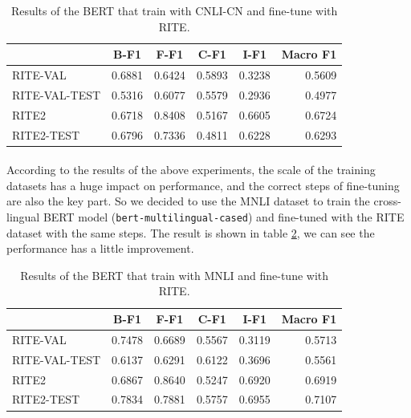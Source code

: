 \documentclass[12pt]{article}
\begin{document}
\begin{CJK*}{UTF8}{bkai}
\begin{spacing}{1.77}
\begin{table}[ht!]
  \centering
  \begin{tabular}{|l|r|r|r|r|r|}
  \hline
   & \multicolumn{1}{c|}{B-F1} & \multicolumn{1}{c|}{F-F1} & \multicolumn{1}{c|}{C-F1} & \multicolumn{1}{c|}{I-F1} & \multicolumn{1}{c|}{Macro F1} \\ \hline
  RITE-VAL & 0.6881 & 0.6424 & 0.5893 & 0.3238 & 0.5609 \\ \hline
  RITE-VAL-TEST & 0.5316 & 0.6077 & 0.5579 & 0.2936 & 0.4977 \\ \hline
  RITE2 & 0.6718 & 0.8408 & 0.5167 & 0.6605 & 0.6724 \\ \hline
  RITE2-TEST & 0.6796 & 0.7336 & 0.4811 & 0.6228 & 0.6293 \\ \hline
  \end{tabular}
  \caption{Results of the BERT that train with CNLI-CN and fine-tune with RITE.}
  \label{result:bert_cnli_cn}
\end{table}

\paragraph{}
According to the results of the above experiments, the scale of the training datasets has a huge impact on performance, and the correct steps of fine-tuning are also the key part. So we decided to use the MNLI dataset to train the cross-lingual BERT model (\texttt{bert-multilingual-cased}) and fine-tuned with the RITE dataset with the same steps. The result is shown in table \ref{result:bert_mnli_transfer}, we can see the performance has a little improvement.

\begin{table}[ht!]
  \centering
  \begin{tabular}{|l|r|r|r|r|r|}
  \hline
   & \multicolumn{1}{c|}{B-F1} & \multicolumn{1}{c|}{F-F1} & \multicolumn{1}{c|}{C-F1} & \multicolumn{1}{c|}{I-F1} & \multicolumn{1}{c|}{Macro F1} \\ \hline
  RITE-VAL & 0.7478 & 0.6689 & 0.5567 & 0.3119 & 0.5713 \\ \hline
  RITE-VAL-TEST & 0.6137 & 0.6291 & 0.6122 & 0.3696 & 0.5561 \\ \hline
  RITE2 & 0.6867 & 0.8640 & 0.5247 & 0.6920 & 0.6919 \\ \hline
  RITE2-TEST & 0.7834 & 0.7881 & 0.5757 & 0.6955 & 0.7107 \\ \hline
  \end{tabular}
  \caption{Results of the BERT that train with MNLI and fine-tune with RITE.}
  \label{result:bert_mnli_transfer}
\end{table}


\end{spacing}
\end{CJK*}
\end{document}
